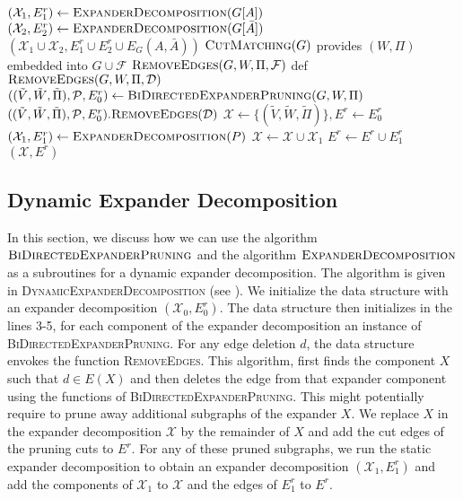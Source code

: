 \documentclass[11pt]{article}
\begin{document}
\begin{algorithm}[H]
    \begin{algorithmic}[1]
    \caption{$\textsc{ExpanderDecomposition}(G)$}\label{alg:StaticExpanderDecomposition}
    \State $(\mathcal{X}_1, E^r_1) \leftarrow \textsc{ExpanderDecomposition}(G[A])$
    \State $(\mathcal{X}_2, E^r_2) \leftarrow \textsc{ExpanderDecomposition}(G[\bar{A}])$
    \State \Return $(\mathcal{X}_1 \cup \mathcal{X}_2, E^r_1 \cup E^r_2 \cup E_G(A,\bar{A}))$
    \Else
    \State $\textsc{CutMatching}(G)$ provides $(W, \Pi)$ embedded into $G \cup \mathcal{F}$
    \State \Return $\textsc{RemoveEdges}(G, W, \Pi, \mathcal{F})$
    \EndIf
    \State 
    \State def $\textsc{RemoveEdges}(G, W, \Pi, \mathcal{D})$
    \Indent
    \State $((\tilde{V}, \tilde{W}, \tilde{\Pi}), \mathcal{P}, E^r_0) \leftarrow \textsc{BiDirectedExpanderPruning}(G, W, \Pi)$
    \State $((\tilde{V}, \tilde{W}, \tilde{\Pi}), \mathcal{P}, E^r_0).\textsc{RemoveEdges}(\mathcal{D})$
    \State $\mathcal{X} \leftarrow \{(\tilde{V}, \tilde{W}, \tilde{\Pi})\}, E^r \leftarrow E^r_0$
    \State \label{alg:SED-recursion} $(\mathcal{X}_1, E^r_1) \leftarrow \textsc{ExpanderDecomposition}(P)$
    \State $\mathcal{X} \leftarrow \mathcal{X} \cup \mathcal{X}_1$
    \State $E^r \leftarrow E^r \cup E^r_1$
    \EndFor
    \State \Return $(\mathcal{X}, E^r)$
    \EndIndent
    \end{algorithmic}
\end{algorithm}


\subsection{Dynamic Expander Decomposition}
\label{subsec:dynExpanderDecomposition}

In this section, we discuss how we can use the algorithm $\textsc{BiDirectedExpanderPruning}$ and the algorithm $\textsc{ExpanderDecomposition}$ as a subroutines for a dynamic expander decomposition. The algorithm is given in \textsc{DynamicExpanderDecomposition} (see ). We initialize the data structure with an expander decomposition $(\mathcal{X}_0, E^r_0)$. The data structure then initializes in the lines 3-5, for each component of the expander decomposition an instance of \textsc{BiDirectedExpanderPruning}. For any edge deletion $d$, the data structure envokes the function \textsc{RemoveEdges}. This algorithm, first finds the component $X$ such that $d \in E(X)$ and then deletes the edge from that expander component using the functions of \textsc{BiDirectedExpanderPruning}. This might potentially require to prune away additional subgraphs of the expander $X$. We replace $X$ in the expander decomposition $\mathcal{X}$ by the remainder of $X$ and add the cut edges of the pruning cuts to $E^r$. For any of these pruned subgraphs, we run the static expander decomposition to obtain an expander decomposition $(\mathcal{X}_1, E^r_1)$ and add the components of $\mathcal{X}_1$ to $\mathcal{X}$ and the edges of $E^r_1$ to $E^r$. 
\end{document}
